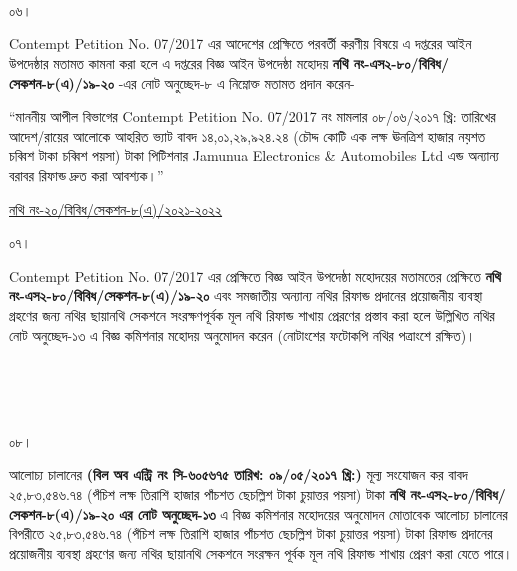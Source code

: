 \documentclass[12pt]{article}
\newcommand{\fileno}{নথি নং-২০/বিবিধ/সেকশন-৮(এ)/২০২১-২০২২}
\newcommand{\tvat}{১৪,০১,২৯,৯২৪.২৪ (চৌদ্দ কোটি এক লক্ষ ঊনত্রিশ হাজার নয়শত চব্বিশ টাকা চব্বিশ পয়সা) টাকা}
\newcommand{\vat}{২৫,৮৩,৫৪৬.৭৪ (পঁচিশ লক্ষ তিরাশি হাজার পাঁচশত ছেচল্লিশ টাকা চুয়াত্তর পয়সা) টাকা}
\newcommand{\cno}{৬০৫৬৭৫}
\newcommand{\dt}{০৯/০৫/২০১৭}
\begin{document}
\\
\\
\\
\begin{minipage}[t]{0.05\linewidth}
০৬।
\end{minipage}
\begin{minipage}[t]{1\linewidth}
Contempt Petition No. 07/2017
এর আদেশের প্রেক্ষিতে পরবর্তী
করণীয় বিষয়ে এ দপ্তরের আইন
উপদেষ্ঠার মতামত কামনা করা হলে এ দপ্তরের
বিজ্ঞ আইন উপদেষ্ঠা মহোদয়
\textbf{নথি নং-এস২-৮০/বিবিধ/সেকশন-৮(এ)/১৯-২০}
-এর নোট অনুচ্ছেদ-৮ এ নিম্নোক্ত মতামত প্রদান করেন-


\hspace{1em}``মাননীয় আপীল বিভাগের
Contempt Petition No. 07/2017
নং মামলার ০৮/০৬/২০১৭ খ্রি: তারিখের
আদেশ/রায়ের আলোকে আহরিত ভ্যাট বাবদ
{\tvat} পিটিশনার
Jamunua Electronics \& Automobiles Ltd
এন্ড অন্যান্য বরাবর রিফান্ড
দ্রুত করা আবশ্যক।''
\end{minipage}
\newpage
\begin{minipage}[t]{0.59\linewidth}
\hspace{0.5em}
\end{minipage}
\begin{minipage}[t]{1\textwidth}
\underline{{\fileno}}
\end{minipage}
\begin{minipage}[t]{0.05\linewidth}
০৭।
\end{minipage}
\begin{minipage}[t]{1\linewidth}
Contempt Petition No. 07/2017
এর প্রেক্ষিতে বিজ্ঞ আইন উপদেষ্ঠা মহোদয়ের
মতামতের প্রেক্ষিতে
\textbf{নথি নং-এস২-৮০/বিবিধ/সেকশন-৮(এ)/১৯-২০}
এবং সমজাতীয় অন্যান্য নথির
রিফান্ড প্রদানের প্রয়োজনীয় ব্যবস্থা গ্রহণের
জন্য নথির ছায়ানথি সেকশনে
সংরক্ষণপূর্বক মূল নথি রিফান্ড
শাখায় প্রেরণের প্রস্তাব করা হলে উল্লিখিত নথির
নোট অনুচ্ছেদ-১৩ এ বিজ্ঞ কমিশনার মহোদয় অনুমোদন
করেন (নোটাংশের ফটোকপি নথির পত্রাংশে রক্ষিত)।
\end{minipage}
\\
\\
\\
\begin{minipage}[t]{0.05\linewidth}
০৮।
\end{minipage}
\begin{minipage}[t]{1\linewidth}
আলোচ্য চালানের
\textbf{(বিল অব এন্ট্রি নং সি-{\cno} তারিখ: {\dt} খ্রি:)} মূল্য সংযোজন কর বাবদ
{\vat} \textbf{নথি নং-এস২-৮০/বিবিধ/সেকশন-৮(এ)/১৯-২০
এর নোট অনুচ্ছেদ-১৩} এ বিজ্ঞ কমিশনার মহোদয়ের
অনুমোদন মোতাবেক আলোচ্য চালানের
বিপরীতে
{\vat} রিফান্ড প্রদানের প্রয়োজনীয় ব্যবস্থা গ্রহণের জন্য
নথির ছায়ানথি সেকশনে সংরক্ষন পূর্বক
মূল নথি রিফান্ড শাখায় প্রেরণ করা যেতে পারে।
\end{minipage}



\thispagestyle{laststyle}
\end{document}
